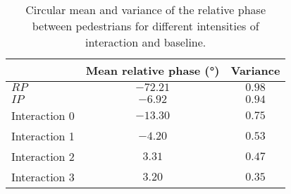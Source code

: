 \begin{table}
\centering
\caption{Circular mean and variance of the relative phase between pedestrians for different intensities of interaction and baseline.}
\label{tab:relative_phase}
\begin{tabular}{lcc}
\toprule
& Mean relative phase (°) & Variance \\
\midrule
$RP$ & $-72.21$ & $0.98$ \\
$IP$ & $-6.92$ & $0.94$ \\
\midrule
Interaction 0 & $-13.30$ & $0.75$ \\
Interaction 1 & $-4.20$ & $0.53$ \\
Interaction 2 & $3.31$ & $0.47$ \\
Interaction 3 & $3.20$ & $0.35$ \\
\bottomrule
\end{tabular}
\end{table}
